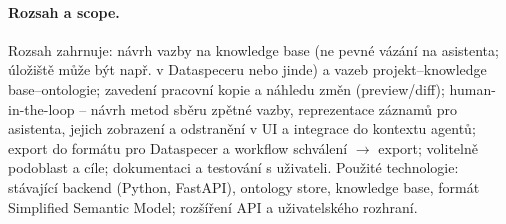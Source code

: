 \documentclass{article}
\begin{document}
\paragraph{Rozsah a scope.}
Rozsah zahrnuje: návrh vazby na knowledge base (ne pevné vázání na asistenta; úložiště může být např. v Dataspeceru nebo jinde) a vazeb projekt--knowledge base--ontologie; zavedení pracovní kopie a náhledu změn (preview/diff); human-in-the-loop -- návrh metod sběru zpětné vazby, reprezentace záznamů pro asistenta, jejich zobrazení a odstranění v UI a integrace do kontextu agentů; export do formátu pro Dataspecer a workflow schválení $\to$ export; volitelně podoblast a cíle; dokumentaci a testování s uživateli. Použité technologie: stávající backend (Python, FastAPI), ontology store, knowledge base, formát Simplified Semantic Model; rozšíření API a uživatelského rozhraní.
\end{document}
